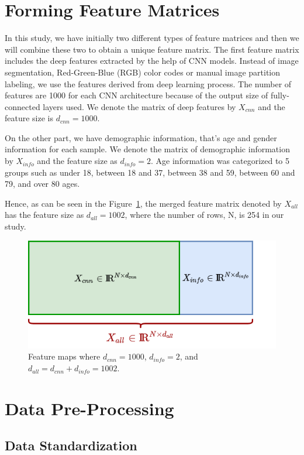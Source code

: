 \section{Forming Feature Matrices} \label{sec:CH5_forming_features}

In this study, we have initially two different types of feature matrices and then we will combine these two to obtain a unique feature matrix. The first feature matrix includes the deep features extracted by the help of CNN models. Instead of image segmentation, Red-Green-Blue (RGB) color codes or manual image partition labeling, we use the features derived from deep learning process. The number of features are 1000 for each CNN architecture because of the output size of fully-connected layers used. We denote the matrix of deep features by $X_{cnn}$ and the feature size is $d_{cnn} = 1000$.

On the other part, we have demographic information, that's age and gender information for each sample. We denote the matrix of demographic information by $X_{info}$ and the feature size as $d_{info} = 2$. Age information was categorized to 5 groups such as under 18, between 18 and 37, between 38 and 59, between 60 and 79, and over 80 ages.

Hence, as can be seen in the Figure~\ref{fig:feature_maps}, the merged feature matrix denoted by $X_{all}$ has the feature size as $d_{all} = 1002$, where the number of rows, N, is 254 in our study.

\begin{figure}[h]
    \centering
    \includegraphics[width=.6\linewidth]{fig/feature_maps.png}
    \vspace{2mm}
    \caption{Feature maps where $d_{cnn} = 1000$, $d_{info} = 2$, and $d_{all} = d_{cnn} + d_{info} = 1002$.}
    \label{fig:feature_maps}
\end{figure}

\section{Data Pre-Processing}

\subsection{Data Standardization}

